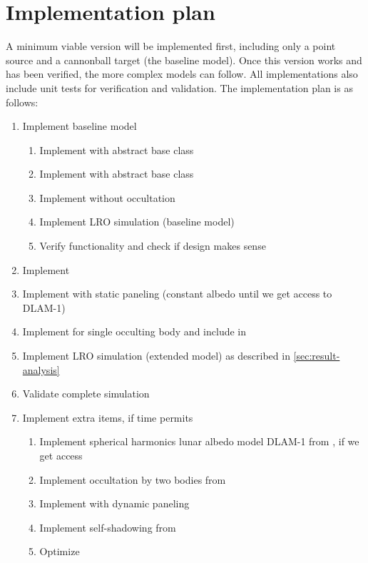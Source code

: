 \documentclass[parskip=full,DIV=15]{scrartcl}
\begin{document}
\section{Implementation plan}
A minimum viable version will be implemented first, including only a point source and a cannonball target (the baseline model). Once this version works and has been verified, the more complex models can follow. All implementations also include unit tests for verification and validation. The implementation plan is as follows:
\begin{enumerate}
   \item Implement baseline model
   \begin{enumerate}
      \item Implement  with abstract base class
      \item Implement  with abstract base class
      \item Implement  without occultation
      \item Implement LRO simulation (baseline model)
      \item Verify functionality and check if design makes sense
   \end{enumerate}
   \item Implement  
   \item Implement  with static paneling (constant albedo until we get access to DLAM-1)
   \item Implement  for single occulting body and include in \\ 
   \item Implement LRO simulation (extended model) as described in \cref{sec:result-analysis}
   \item Validate complete simulation
   \item Implement extra items, if time permits
   \begin{enumerate}
      \item Implement spherical harmonics lunar albedo model DLAM-1 from \textcite{Floberghagen1999}, if we get access
      \item Implement occultation by two bodies from \textcite{Zhang2019}
      \item Implement  with dynamic paneling
      \item Implement self-shadowing from \textcite{Mazarico2009}
      \item Optimize
   \end{enumerate}
\end{enumerate}







\printbibliography
\end{document}

